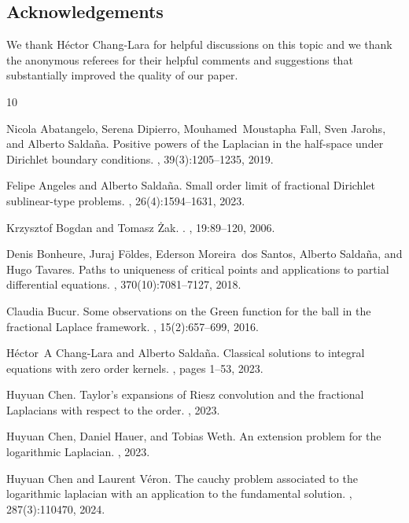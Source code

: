 \documentclass[11pt]{article}
\numberwithin{equation}{section}
\begin{document}
\subsection*{Acknowledgements} We thank Héctor Chang-Lara for helpful discussions on this topic and we thank the anonymous referees for their helpful comments and suggestions that substantially improved the quality of our paper.
\begin{thebibliography}{10}

Nicola Abatangelo, Serena Dipierro, Mouhamed~Moustapha Fall, Sven Jarohs, and
  Alberto Salda{\~n}a.
\newblock Positive powers of the {L}aplacian in the half-space under
  {D}irichlet boundary conditions.
, 39(3):1205--1235,
  2019.

Felipe Angeles and Alberto Salda\~{n}a.
\newblock Small order limit of fractional {D}irichlet sublinear-type problems.
, 26(4):1594--1631, 2023.

Krzysztof Bogdan and Tomasz Żak.
.
, 19:89--120, 2006.

Denis Bonheure, Juraj F\"{o}ldes, Ederson Moreira~dos Santos, Alberto
  Salda\~{n}a, and Hugo Tavares.
\newblock Paths to uniqueness of critical points and applications to partial
  differential equations.
, 370(10):7081--7127, 2018.

Claudia Bucur.
\newblock Some observations on the {G}reen function for the ball in the
  fractional {L}aplace framework.
, 15(2):657--699, 2016.

H{\'e}ctor~A Chang-Lara and Alberto Salda{\~n}a.
\newblock Classical solutions to integral equations with zero order kernels.
, pages 1--53, 2023.

Huyuan Chen.
\newblock Taylor's expansions of {R}iesz convolution and the fractional
  {L}aplacians with respect to the order.
, 2023.

Huyuan Chen, Daniel Hauer, and Tobias Weth.
\newblock An extension problem for the logarithmic {L}aplacian.
, 2023.

Huyuan Chen and Laurent V{\'e}ron.
\newblock The cauchy problem associated to the logarithmic laplacian with an
  application to the fundamental solution.
, 287(3):110470, 2024.


\end{thebibliography}
\end{document}
